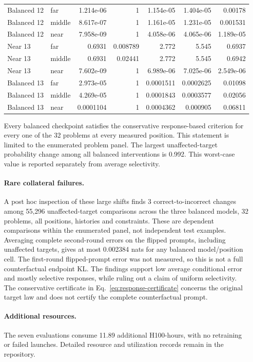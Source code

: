 \begin{table}[t]
\begin{tabular}{llrrrrr}
Balanced 12 & far & 1.214e-06 & 1 & 1.154e-05 & 1.404e-05 & 0.00178\\
Balanced 12 & middle & 8.617e-07 & 1 & 1.161e-05 & 1.231e-05 & 0.001531\\
Balanced 12 & near & 7.958e-09 & 1 & 4.058e-06 & 4.065e-06 & 1.189e-05\\
Near 13 & far & 0.6931 & 0.008789 & 2.772 & 5.545 & 0.6937\\
Near 13 & middle & 0.6931 & 0.02441 & 2.772 & 5.545 & 0.6942\\
Near 13 & near & 7.602e-09 & 1 & 6.989e-06 & 7.025e-06 & 2.549e-06\\
Balanced 13 & far & 2.973e-05 & 1 & 0.0001511 & 0.0002625 & 0.01098\\
Balanced 13 & middle & 4.269e-05 & 1 & 0.0001843 & 0.0003577 & 0.02056\\
Balanced 13 & near & 0.0001104 & 1 & 0.0004362 & 0.000905 & 0.06811\\
\bottomrule
\end{tabular}
\end{table}
Every balanced checkpoint satisfies the conservative response-based criterion for every one of the 32 problems at every measured position. This statement is limited to the enumerated problem panel.
The largest unaffected-target probability change among all balanced interventions is 0.992. This worst-case value is reported separately from average selectivity.
\paragraph{Rare collateral failures.}
A post hoc inspection of these large shifts finds 3 correct-to-incorrect changes among 55,296 unaffected-target comparisons across the three balanced models, 32 problems, all positions, histories and constraints. These are dependent comparisons within the enumerated panel, not independent test examples.
Averaging complete second-round errors on the flipped prompts, including unaffected targets, gives at most 0.002384 nats for any balanced model/position cell. The first-round flipped-prompt error was not measured, so this is not a full counterfactual endpoint KL.
The findings support low average conditional error and mostly selective responses, while ruling out a claim of uniform selectivity. The conservative certificate in Eq.~\eqref{eq:response-certificate} concerns the original target law and does not certify the complete counterfactual prompt.
\paragraph{Additional resources.}
The seven evaluations consume 11.89 additional H100-hours, with no retraining or failed launches. Detailed resource and utilization records remain in the repository.

